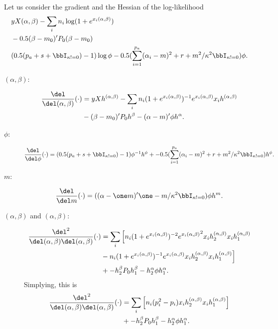 \documentclass[]{article}
\newcommand{\graddel}[1]{\frac{\del}{\del #1}}
\newcommand{\hessdel}[2]{\frac{\del^2}{\del #1 \del #2}}
\begin{document}
Let us consider the gradient and the Hessian of the log-likelihood
\begin{align*}
& y X (\alpha, \beta) - \sum_i n_i \log (1 + e^{x_i (\alpha, \beta)}) \\
& - 0.5 (\beta - m_0)' P_0 (\beta - m_0) \\
& (0.5 (p_a + s + \bbI_{\kappa != 0}) - 1) \log \phi - 0.5 (\sum_{i=1}^{p_a}
(\alpha_i - m)^2 + r + m^2 / \kappa^2 \bbI_{\kappa != 0}) \phi.
\end{align*}
\begin{description}

\item[$(\alpha, \beta)$:]
\begin{align*}
\frac{\del}{\del (\alpha, \beta)} (\cdot) 
& = y X h^{(\alpha, \beta)} 
  - \sum_i n_i (1 + e^{x_i(\alpha, \beta)})^{-1} e^{x_i (\alpha, \beta)} x_i h^{(\alpha, \beta)} \\
& - (\beta - m_0)' P_0 h^{\beta}
  - (\alpha -  m)' \phi h^{\alpha}.
\end{align*}

\item[$\phi$:]
\begin{align*}
\graddel{\phi} (\cdot) = (0.5 (p_a + s + \bbI_{\kappa != 0}) - 1) \phi^{-1}
h^{\phi}
+ - 0.5 (\sum_{i=1}^{p_a}
(\alpha_i - m)^2 + r + m^2 / \kappa^2 \bbI_{\kappa != 0}) h^{\phi}.
\end{align*}

\item[$m$:]
\begin{align*}
\graddel{m} (\cdot) = ( (\alpha - \one m)' \one - m / \kappa^2
\bbI_{\kappa != 0}) \phi h^{m}.
\end{align*}

\item[$(\alpha, \beta)$ and $(\alpha, \beta)$:]
\begin{align*}
\hessdel{(\alpha,\beta)}{(\alpha,\beta)} (\cdot)
& = \sum_i \Big[ n_i (1 + e^{x_i(\alpha, \beta)})^{-2} {e^{x_i (\alpha,
    \beta)}}^2 x_i h^{(\alpha,\beta)}_2 x_i h^{(\alpha,\beta)}_1 \\
& - n_i (1 + e^{x_i(\alpha, \beta)})^{-1} e^{x_i (\alpha, \beta)} x_i
  h^{(\alpha,\beta)}_2 x_i h^{(\alpha,\beta)}_1 \Big] \\
& + - h^{\beta}_2 P_0 h^{\beta}_1 - h^{\alpha}_2 \phi h^{\alpha}_1.
\end{align*}
Simplying, this is
\begin{align*}
\hessdel{(\alpha,\beta)}{(\alpha,\beta)} (\cdot)
& = \sum_i \Big[ n_i (p_i^2 - p_i) x_i
  h^{(\alpha,\beta)}_2 x_i h^{(\alpha,\beta)}_1 \Big] \\
& + - h^{\beta}_2 P_0 h^{\beta}_1 - h^{\alpha}_2 \phi h^{\alpha}_1.
\end{align*}


\end{description}
\end{document}
